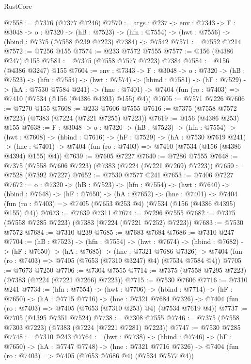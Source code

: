 \begin{lexlean}{RustCore}
\begin{coremodule}
@7558 := @7376 (@7377 @7246)
@7570 := {args : @237} ->
  {env : @7343} ->
  {F : @3048} ->
  {o : @7320} ->
  (hB : @7523) ->
  (hfn : @7554) -> (hwt : @7556) -> (hbind : @7375 (@7558 @239 @7223) @7384) -> @7542
@7571 := @7552 @7214
@7572 := @7256 @155
@7574 := @233 @7572 @7555
@7577 := @156 (@4386 @247) @155
@7581 := @7375 (@7558 @7577 @7223) @7384
@7584 := @156 (@4386 @3247) @155
@7604 := {env : @7343} ->
  {F : @3048} ->
  {o : @7320} ->
  (hB : @7523) ->
  (hfn : @7554) ->
  (hwt : @7574) ->
  (hbind : @7581) ->
  (hF : @7529) ->
  (hA : @7530 @7584 @241) ->
  (hne : @7401) -> @7404 (fun (ro : @7403) => @7410 (@7534 (@156 (@4386 @4393) @155) @4))
@7605 := @7571 @7226
@7606 := @7270 @155
@7608 := @233 @7606 @7555
@7616 := @7375 (@7558 @7572 @7223) (@7383 (@7224 (@7221 @7255) @7223))
@7619 := @156 (@4386 @253) @155
@7638 := {F : @3048} ->
  {o : @7320} ->
  (hB : @7523) ->
  (hfn : @7554) ->
  (hwt : @7608) ->
  (hbind : @7616) ->
  (hF : @7529) ->
  (hA : @7530 @7619 @241) ->
  (hne : @7401) -> @7404 (fun (ro : @7403) => @7410 (@7534 (@156 (@4386 @4394) @155) @4))
@7639 := @7605 @7227
@7640 := @7286 @7555
@7648 := @7375 (@7558 @7606 @7223) (@7383 (@7224 (@7221 @7269) @7223))
@7650 := @7528 (@7392 @7227)
@7652 := @7530 @7577 @241
@7653 := @7406 @7227
@7672 := {o : @7320} ->
  (hB : @7523) ->
  (hfn : @7554) ->
  (hwt : @7640) ->
  (hbind : @7648) ->
  (hF : @7650) ->
  (hA : @7652) ->
  (hne : @7401) ->
  @7404 (fun (ro : @7403) => @7405 (@7653 @253 @4) (@7534 (@156 (@4386 @4395) @155) @4))
@7673 := @7639 @7311
@7674 := @7296 @7555
@7682 := @7375 (@7558 @7285 @7223) (@7383 (@7224 (@7221 @7252) @7223))
@7683 := @7530 @7572
@7684 := @7310 @239
@7685 := @7683 @7684
@7686 := @7310 @247
@7704 := (hB : @7523) ->
  (hfn : @7554) ->
  (hwt : @7674) ->
  (hbind : @7682) ->
  (hF : @7650) ->
  (hA : @7685) ->
  (hne : @7321 @7686 @7326) ->
  @7404 (fun (ro : @7403) => @7405 (@7653 (@7310 @3247) @4) (@7534 @7584 @4))
@7705 := @7673 @7250
@7706 := @7304 @7555
@7714 := @7375 (@7558 @7295 @7223) (@7383 (@7224 (@7221 @7266) @7223))
@7715 := @7530 @7606
@7716 := @7310 @241
@7734 := (hfn : @7554) ->
  (hwt : @7706) ->
  (hbind : @7714) ->
  (hF : @7650) ->
  (hA : @7715 @7716) ->
  (hne : @7321 @7684 @7326) ->
  @7404 (fun (ro : @7403) => @7405 (@7653 (@7310 @253) @4) (@7534 @7619 @4))
@7737 := @7705 (@1395 @7351 @7524)
@7738 := @7308 @7555
@7746 := @7375 (@7558 @7303 @7223) (@7383 (@7224 (@7221 @7281) @7223))
@7747 := @7530 @7285
@7748 := @7310 @243
@7764 := (hwt : @7738) ->
  (hbind : @7746) ->
  (hF : @7650) ->
  (hA : @7747 @7748) ->
  (hne : @7321 @7716 @7326) -> @7404 (fun (ro : @7403) => @7405 (@7653 @7686 @4) (@7534 @7577 @4))

\end{coremodule}
\end{lexlean}
